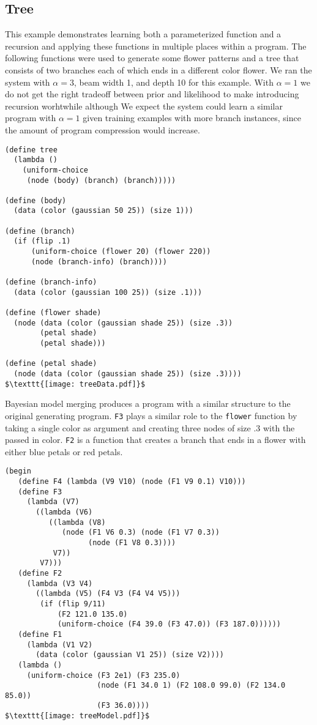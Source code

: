 \documentclass[a4paper,10pt]{article}
\begin{document}
\subsection{Tree}
This example demonstrates learning both a parameterized function and a recursion and applying these functions in multiple places within a program.  The following functions were used to generate some flower patterns and a tree that consists of two branches each of which ends in a different color flower.  We ran the system with $\alpha=3$, beam width 1, and depth 10 for this example.  With $\alpha=1$ we do not get the right tradeoff between prior and likelihood to make introducing recursion worhtwhile although We expect the system could learn a similar program with $\alpha=1$ given training examples with more branch instances, since the amount of program compression would increase.
\begin{lstlisting}[mathescape=true]
(define tree
  (lambda ()
    (uniform-choice
     (node (body) (branch) (branch)))))

(define (body) 
  (data (color (gaussian 50 25)) (size 1)))

(define (branch)
  (if (flip .1)
      (uniform-choice (flower 20) (flower 220))
      (node (branch-info) (branch))))

(define (branch-info)
  (data (color (gaussian 100 25)) (size .1)))

(define (flower shade)
  (node (data (color (gaussian shade 25)) (size .3))
        (petal shade)
        (petal shade)))

(define (petal shade)
  (node (data (color (gaussian shade 25)) (size .3))))
$\texttt{[image: treeData.pdf]}$
\end{lstlisting}
Bayesian model merging produces a program with a similar structure to the original generating program.  \texttt{F3} plays a similar role to the \texttt{flower} function by taking a single color as argument and creating three nodes of size .3 with the passed in color.  \texttt{F2} is a function that creates a branch that ends in a flower with either blue petals or red petals.
\begin{lstlisting}[mathescape=true]
(begin
   (define F4 (lambda (V9 V10) (node (F1 V9 0.1) V10)))
   (define F3
     (lambda (V7)
       ((lambda (V6)
          ((lambda (V8)
             (node (F1 V6 0.3) (node (F1 V7 0.3))
                   (node (F1 V8 0.3))))
           V7))
        V7)))
   (define F2
     (lambda (V3 V4)
       ((lambda (V5) (F4 V3 (F4 V4 V5)))
        (if (flip 9/11)
            (F2 121.0 135.0)
            (uniform-choice (F4 39.0 (F3 47.0)) (F3 187.0))))))
   (define F1
     (lambda (V1 V2)
       (data (color (gaussian V1 25)) (size V2))))
   (lambda ()
     (uniform-choice (F3 2e1) (F3 235.0)
                     (node (F1 34.0 1) (F2 108.0 99.0) (F2 134.0 85.0))
                     (F3 36.0))))
$\texttt{[image: treeModel.pdf]}$
\end{lstlisting}
\end{document}
